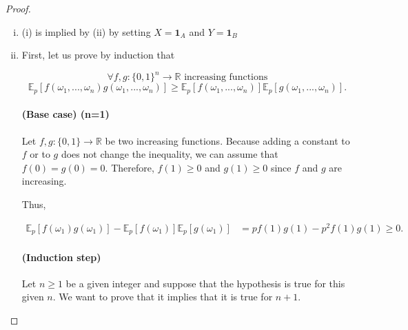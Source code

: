 \documentclass[a4paper,11pt]{article}
\theoremstyle{plain}
\theoremstyle{definition}
\theoremstyle{remark}
\begin{document}
\begin{proof}
\text{}
\begin{enumerate}[(i)]
    \item (i) is implied by (ii) by setting $X = \mathbf{1}_A$ and $Y = \mathbf{1}_B$
    \item
    {
    First, let us prove by induction that
    
    \[ \forall f, g : \{ 0,1 \}^n \longrightarrow \mathbb{R} \text{ increasing functions} \]
    \[\mathbb{E}_p[f(\omega_1, ..., \omega_n)g(\omega_1, ..., \omega_n)] \geq \mathbb{E}_p[f(\omega_1, ..., \omega_n)]\mathbb{E}_p[g(\omega_1, ..., \omega_n)]. \]

        \paragraph{(Base case) (n=1)}
        
        Let $f, g : \{ 0,1 \} \longrightarrow \mathbb{R}$ be two increasing functions. Because adding a constant to $f$ or to $g$ does not change the inequality, we can assume that $f(0) = g(0) = 0$.
        Therefore, $f(1) \geq 0$ and $g(1) \geq 0$ since $f$ and $g$ are increasing.
        
        Thus,
        
        \begin{align*}
            \mathbb{E}_p[f(\omega_1)g(\omega_1)]-\mathbb{E}_p[f(\omega_1)]\mathbb{E}_p[g(\omega_1)] &= p f(1) g(1) - p^2 f(1) g(1) \geq 0.
        \end{align*}
        
        \paragraph{(Induction step)}
        Let $n \geq 1$ be a given integer and suppose that the hypothesis is true for this given $n$. We want to prove that it implies that it is true for $n + 1$.
                
}
\end{enumerate}
\end{proof}
\end{document}
